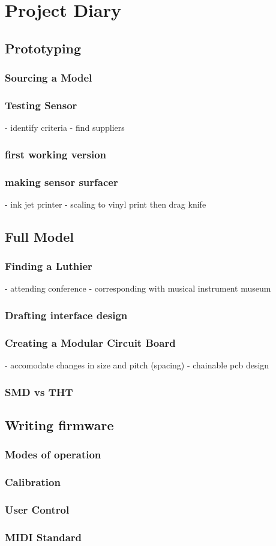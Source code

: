 \chapter{Project Diary}

\section{Prototyping}
\subsection{Sourcing a Model}
\subsection{Testing Sensor}
- identify criteria
- find suppliers
\subsection{first working version}
\subsection{making sensor surfacer}
- ink jet printer
- scaling to vinyl print then drag knife
\section{Full Model}
\subsection{Finding a Luthier}
- attending conference
- corresponding with musical instrument museum
\subsection{Drafting interface design}
\subsection{Creating a Modular Circuit Board}
- accomodate changes in size and pitch (spacing)
- chainable pcb design
\subsection{SMD vs THT}
\section{Writing firmware}
\subsection{Modes of operation}
\subsection{Calibration}
\subsection{User Control}
\subsection{MIDI Standard}


